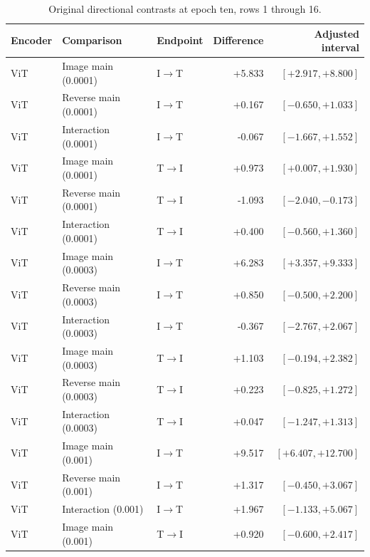 \begin{table}[t]
\centering
\small
\setlength{\tabcolsep}{3pt}
\begin{tabular}{lllrr}
\toprule
Encoder & Comparison & Endpoint & Difference & Adjusted interval\\
\midrule
ViT & Image main (0.0001) & I$\to$T & +5.833 & $[+2.917,+8.800]$ \\
ViT & Reverse main (0.0001) & I$\to$T & +0.167 & $[-0.650,+1.033]$ \\
ViT & Interaction (0.0001) & I$\to$T & -0.067 & $[-1.667,+1.552]$ \\
ViT & Image main (0.0001) & T$\to$I & +0.973 & $[+0.007,+1.930]$ \\
ViT & Reverse main (0.0001) & T$\to$I & -1.093 & $[-2.040,-0.173]$ \\
ViT & Interaction (0.0001) & T$\to$I & +0.400 & $[-0.560,+1.360]$ \\
ViT & Image main (0.0003) & I$\to$T & +6.283 & $[+3.357,+9.333]$ \\
ViT & Reverse main (0.0003) & I$\to$T & +0.850 & $[-0.500,+2.200]$ \\
ViT & Interaction (0.0003) & I$\to$T & -0.367 & $[-2.767,+2.067]$ \\
ViT & Image main (0.0003) & T$\to$I & +1.103 & $[-0.194,+2.382]$ \\
ViT & Reverse main (0.0003) & T$\to$I & +0.223 & $[-0.825,+1.272]$ \\
ViT & Interaction (0.0003) & T$\to$I & +0.047 & $[-1.247,+1.313]$ \\
ViT & Image main (0.001) & I$\to$T & +9.517 & $[+6.407,+12.700]$ \\
ViT & Reverse main (0.001) & I$\to$T & +1.317 & $[-0.450,+3.067]$ \\
ViT & Interaction (0.001) & I$\to$T & +1.967 & $[-1.133,+5.067]$ \\
ViT & Image main (0.001) & T$\to$I & +0.920 & $[-0.600,+2.417]$ \\
\bottomrule
\end{tabular}
\caption{Original directional contrasts at epoch ten, rows 1 through 16.}\label{tab:directional0}
\end{table}


